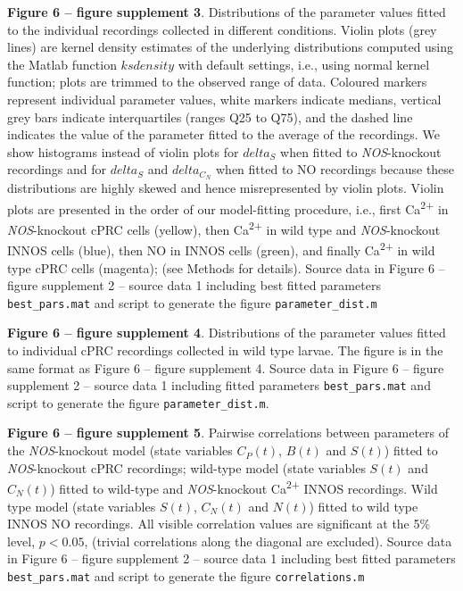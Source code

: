 \documentclass[
  11pt,
  letterpaper,
  DIV=11,
  numbers=noendperiod]{scrartcl}
\begin{document}
\textbf{Figure 6 -- figure supplement 3}. Distributions of the parameter
values fitted to the individual recordings collected in different
conditions. Violin plots (grey lines) are kernel density estimates of
the underlying distributions computed using the Matlab function
\(ksdensity\) with default settings, i.e., using normal kernel function;
plots are trimmed to the observed range of data. Coloured markers
represent individual parameter values, white markers indicate medians,
vertical grey bars indicate interquartiles (ranges Q25 to Q75), and the
dashed line indicates the value of the parameter fitted to the average
of the recordings. We show histograms instead of violin plots for
\(delta_S\) when fitted to \emph{NOS}-knockout recordings and for
\(delta_S\) and \(delta_{C_N}\) when fitted to NO recordings because
these distributions are highly skewed and hence misrepresented by violin
plots. Violin plots are presented in the order of our model-fitting
procedure, i.e., first Ca\textsuperscript{2+} in \emph{NOS}-knockout
cPRC cells (yellow), then Ca\textsuperscript{2+} in wild type and
\emph{NOS}-knockout INNOS cells (blue), then NO in INNOS cells (green),
and finally Ca\textsuperscript{2+} in wild type cPRC cells (magenta);
(see Methods for details). Source data in Figure 6 -- figure supplement
2 -- source data 1 including best fitted parameters
\texttt{best\_pars.mat} and script to generate the figure
\texttt{parameter\_dist.m}

\textbf{Figure 6 -- figure supplement 4}. Distributions of the parameter
values fitted to individual cPRC recordings collected in wild type
larvae. The figure is in the same format as Figure 6 -- figure
supplement 4. Source data in Figure 6 -- figure supplement 2 -- source
data 1 including fitted parameters \texttt{best\_pars.mat} and script to
generate the figure \texttt{parameter\_dist.m}.

\textbf{Figure 6 -- figure supplement 5}. Pairwise correlations between
parameters of the \emph{NOS}-knockout model (state variables \(C_P(t)\),
\(B(t)\) and \(S(t)\)) fitted to \emph{NOS}-knockout cPRC recordings;
wild-type model (state variables \(S(t)\) and \(C_N(t)\)) fitted to
wild-type and \emph{NOS}-knockout Ca\textsuperscript{2+} INNOS
recordings. Wild type model (state variables \(S(t)\), \(C_N(t)\) and
\(N(t)\)) fitted to wild type INNOS NO recordings. All visible
correlation values are significant at the 5\% level, \(p < 0.05\),
(trivial correlations along the diagonal are excluded). Source data in
Figure 6 -- figure supplement 2 -- source data 1 including best fitted
parameters \texttt{best\_pars.mat} and script to generate the figure
\texttt{correlations.m}
\end{document}
